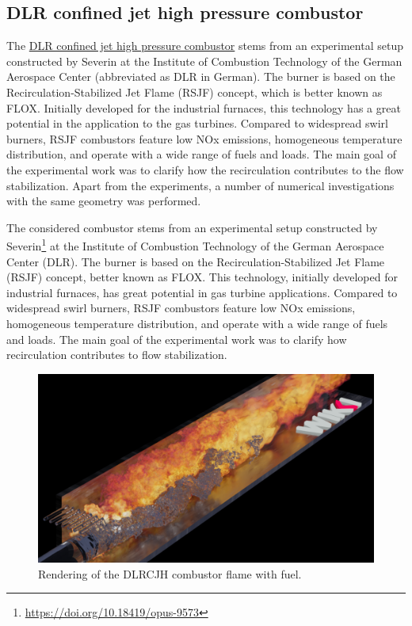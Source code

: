 \subsection{DLR confined jet high pressure combustor}

The \href{https://develop.openfoam.com/exafoam/wp2-validation/-/tree/master/combustion/XiFoam/DLRCJH?ref_type=heads}{DLR confined jet high pressure combustor} stems from an experimental setup constructed by Severin at the Institute of Combustion Technology of the German Aerospace Center (abbreviated as DLR in German). The burner is based on the Recirculation-Stabilized Jet Flame (RSJF) concept, which is better known as FLOX. Initially developed for the industrial furnaces, this technology has a great potential in the application to the gas turbines. Compared to widespread swirl burners, RSJF combustors feature low NOx emissions, homogeneous temperature distribution, and operate with a wide range of fuels and loads. The main goal of the experimental work was to clarify how the recirculation contributes to the flow stabilization. Apart from the experiments, a number of numerical investigations with the same geometry was performed.

The considered combustor stems from an experimental setup constructed by Severin\footnote{\url{https://doi.org/10.18419/opus-9573}} at the Institute of Combustion Technology of the German Aerospace Center (DLR). The burner is based on the Recirculation-Stabilized Jet Flame (RSJF) concept, better known as FLOX. This technology, initially developed for industrial furnaces, has great potential in gas turbine applications. Compared to widespread swirl burners, RSJF combustors feature low NOx emissions, homogeneous temperature distribution, and operate with a wide range of fuels and loads. The main goal of the experimental work was to clarify how recirculation contributes to flow stabilization.

\begin{figure}[H]
    \centering
    \includegraphics[width=\textwidth]{figs/DLRCJH/renderingDLRCJH.png}
    \caption{Rendering of the DLRCJH combustor flame with fuel.}
\end{figure}

